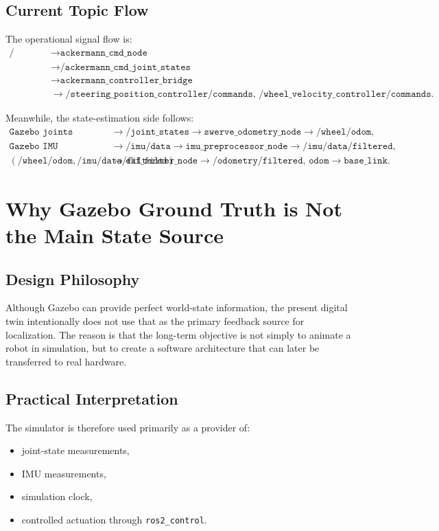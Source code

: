 \documentclass[12pt,a4paper]{report}
\begin{document}
\section{Current Topic Flow}
The operational signal flow is:
\begin{align}
\texttt{/cmd\_vel}
&\rightarrow \texttt{ackermann\_cmd\_node} \nonumber \\
&\rightarrow \texttt{/ackermann\_cmd\_joint\_states} \nonumber \\
&\rightarrow \texttt{ackermann\_controller\_bridge} \nonumber \\
&\rightarrow \texttt{/steering\_position\_controller/commands}, \,
\texttt{/wheel\_velocity\_controller/commands}.
\end{align}

Meanwhile, the state-estimation side follows:
\begin{align}
\texttt{Gazebo joints}
&\rightarrow \texttt{/joint\_states}
\rightarrow \texttt{swerve\_odometry\_node}
\rightarrow \texttt{/wheel/odom}, \\
\texttt{Gazebo IMU}
&\rightarrow \texttt{/imu/data}
\rightarrow \texttt{imu\_preprocessor\_node}
\rightarrow \texttt{/imu/data/filtered}, \\
\left( \texttt{/wheel/odom}, \texttt{/imu/data/filtered} \right)
&\rightarrow \texttt{ekf\_filter\_node}
\rightarrow \texttt{/odometry/filtered}, \, \texttt{odom} \rightarrow \texttt{base\_link}.
\end{align}

\chapter{Why Gazebo Ground Truth is Not the Main State Source}

\section{Design Philosophy}
Although Gazebo can provide perfect world-state information, the present digital twin intentionally does not use that as the primary feedback source for localization. The reason is that the long-term objective is not simply to animate a robot in simulation, but to create a software architecture that can later be transferred to real hardware.

\section{Practical Interpretation}
The simulator is therefore used primarily as a provider of:
\begin{itemize}[leftmargin=*]
  \item joint-state measurements,
  \item IMU measurements,
  \item simulation clock,
  \item controlled actuation through \texttt{ros2\_control}.
\end{itemize}
\end{document}
